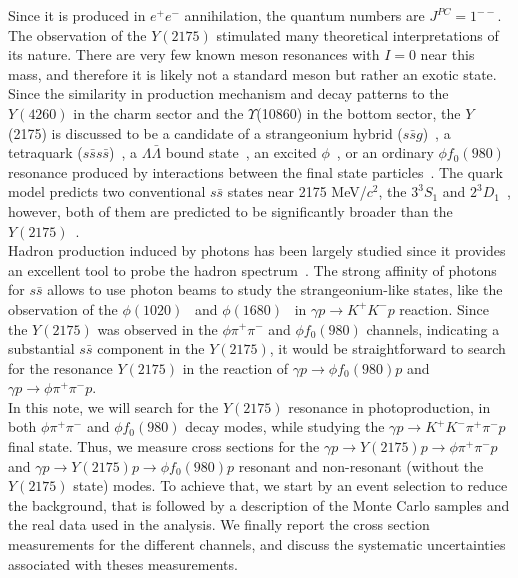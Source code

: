 \noindent Since it is produced in $e^+e^-$ annihilation, the quantum numbers are $J^{PC} = 1^{--}$. The observation of the $Y(2175)$ stimulated many theoretical interpretations of its nature. There are very few known meson resonances with $I = 0$ near this mass, and therefore it is likely not a standard meson but rather an exotic state. Since the similarity in production mechanism and decay patterns to the $Y(4260)$ in the charm sector and the $\Upsilon$(10860) in the bottom sector, the $Y$(2175) is discussed to be a candidate of a strangeonium hybrid ($s\bar{s}g$)~\cite{Gui07}, a tetraquark ($s\bar{s}s\bar{s}$)~\cite{Chen08}, a $\Lambda \bar{\Lambda}$ bound state~\cite{Klempt07}, an excited $\phi$~\cite{Coito09}, or an ordinary $\phi f_0(980)$ resonance produced by interactions between the final state particles~\cite{Alvarez09}. The quark model predicts two conventional $s\bar{s}$ states near 2175 MeV/$c^2$, the ${3}^{3}\!S_{1}$ and ${2}^{3}\!D_{1}$~\cite{Godfrey85, Barnes97}, however, both of them are predicted to be significantly broader than the $Y(2175)$~\cite{Barnes03, Ding07}.\\
Hadron production induced by photons has been largely studied since it provides an excellent tool to probe the hadron spectrum~\cite{Ballam68, Meyer70, Wang14, Wang17}. The strong affinity of photons for $s\bar{s}$ allows to use photon beams to study the strangeonium-like states, like the observation of the $\phi(1020)$~\cite{Mibe05} and $\phi(1680)$~\cite{Aston81} in $\gamma p \rightarrow K^{+}K^{-}p$ reaction. Since the $Y(2175)$ was observed in the $\phi \pi^{+}\pi^{-}$ and $\phi f_{0}(980)$ channels, indicating a substantial $s\bar{s}$ component in the $Y(2175)$, it would be straightforward to search for the resonance $Y(2175)$ in the reaction of $\gamma p \rightarrow \phi f_{0}(980)p$ and $\gamma p \rightarrow \phi \pi^{+}\pi^{-}p$.\\
In this note, we will search for the $Y(2175)$ resonance in photoproduction, in both $\phi \pi^{+}\pi^{-}$ and $\phi f_{0}(980)$ decay modes, while studying the $\gamma p \rightarrow K^{+}K^{-} \pi^{+}\pi^{-} p$ final state. Thus, we measure cross sections for the $\gamma p \rightarrow Y(2175) p \rightarrow \phi \pi^+ \pi^{-} p$ and $\gamma p \rightarrow Y(2175) p \rightarrow \phi f_{0}(980) p$ resonant and non-resonant (without the $Y(2175)$ state) modes. To achieve that, we start by an event selection to reduce the background, that is followed by a description of the Monte Carlo samples and the real data used in the analysis. We finally report the cross section measurements for the different channels, and discuss the systematic uncertainties associated with theses measurements.

